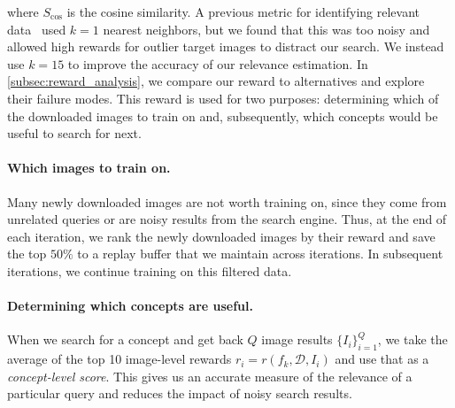 where $S_{\cos}$ is the cosine similarity. A previous metric for identifying relevant data~\cite{jiang2021improving} used $k=1$ nearest neighbors, 
but we found that this was too noisy and allowed high rewards for outlier target images to distract our search.
We instead use $k=15$ to improve the accuracy of our relevance estimation.
In \cref{subsec:reward_analysis}, we compare our reward to alternatives and explore their failure modes. This reward is used for two purposes: determining which of the downloaded images to train on and, subsequently, which concepts would be useful to search for next.

\vspace{-0.06in}
\paragraph{Which images to train on.}
Many newly downloaded images are not worth training on, since they come from unrelated queries or are noisy results from the search engine.
Thus, at the end of each iteration, we rank the newly downloaded images by their reward and save the top $50\%$ to a replay buffer that we maintain across iterations. In subsequent iterations, we continue training on this filtered data.

\vspace{-0.06in}
\paragraph{Determining which concepts are useful.}
When we search for a concept and get back $Q$ image results $\{I_i\}_{i=1}^Q$, we take the average of the top 10 image-level rewards $r_i = r(f_k, \mathcal D, I_i)$ and use that as a \textit{concept-level score}. This gives us an accurate measure of the relevance of a particular query and reduces the impact of noisy search results. 


